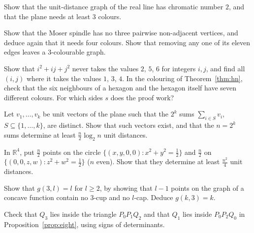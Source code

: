 \begin{exercise}[$\star$]\label{ex:linetwo}
Show that the unit-distance graph of the real line has chromatic number $2$, and that the plane needs at least $3$ colours.
\end{exercise}

\begin{exercise}[$\star\star$]\label{ex:spindle}
Show that the Moser spindle has no three pairwise non-adjacent vertices, and deduce again that it needs four colours. Show that removing any one of its
eleven edges leaves a $3$-colourable graph.
\end{exercise}

\begin{exercise}[$\star\star$]\label{ex:hexcolour}
Show that $i^2+ij+j^2$ never takes the values $2$, $5$, $6$ for integers $i,j$, and find all $(i,j)$ where it takes the values $1$, $3$, $4$. In the
colouring of Theorem~\ref{thm:hn}, check that the six neighbours of a hexagon and the hexagon itself have seven different colours. For which
sides $s$ does the proof work?
\end{exercise}

\begin{exercise}[$\star\star$]\label{ex:unitcube}
Let $v_1,\dots,v_k$ be unit vectors of the plane such that the $2^k$ sums $\sum_{i\in S}v_i$, $S\subseteq\{1,\dots,k\}$, are distinct. Show that such
vectors exist, and that the $n=2^k$ sums determine at least $\frac n2\log_2n$ unit distances.
\end{exercise}

\begin{exercise}[$\star$]\label{ex:lenz}
In $\mathbb R^4$, put $\frac n2$ points on the circle $\{(x,y,0,0):x^2+y^2=\frac12\}$ and $\frac n2$ on $\{(0,0,z,w):z^2+w^2=\frac12\}$ ($n$ even). Show
that they determine at least $\frac{n^2}4$ unit distances.
\end{exercise}

\begin{exercise}[$\star\star$]\label{ex:cupcap}
Show that $g(3,l)=l$ for $l\ge2$, by showing that $l-1$ points on the graph of a concave function contain no $3$-cup and no $l$-cap. Deduce $g(k,3)=k$.
\end{exercise}

\begin{exercise}[$\star$]\label{ex:pentwitness}
Check that $Q_3$ lies inside the triangle $P_0P_1Q_2$ and that $Q_1$ lies inside $P_0P_2Q_0$ in Proposition~\ref{prop:eight}, using signs of
determinants.
\end{exercise}

